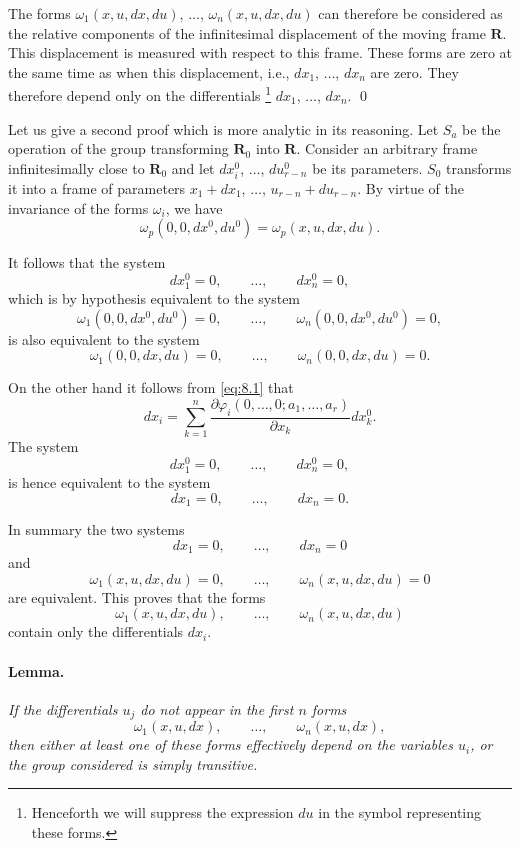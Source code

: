 \documentclass[leqno,11pt]{book}
\makeatletter
\numberwithin{equation}{chapter}
\newcommand{\pd}{\partial}
\theoremstyle{shape1}
\theoremstyle{shapesmall}
\let\old@phi\phi
\let\old@varphi\varphi
\let\phi\old@varphi
\let\varphi\old@phi
\newcommand{\somespace}{\vspace{9pt}}
\makeatother
\begin{document}
The forms $\omega_{1}(x,u,dx,du)$, $\dots$, $\omega_{n}(x,u,dx,du)$ can therefore be considered as the relative components of the infinitesimal displacement of the moving frame $\mathbf{R}$. This displacement is measured with respect to this frame. These forms are zero at the same time as when this displacement, i.e., $dx_{1}$, $\dots$, $dx_{n}$ are zero.  They therefore depend only on the differentials \footnote{Henceforth we will suppress the expression $du$ in the symbol representing these forms.} $dx_{1}$, $\dots$, $dx_{n}$. \qed

\somespace

Let us give a second proof which is more analytic in its reasoning. Let $S_{a}$ be the operation of the group transforming $\mathbf{R}_{0}$ into $\mathbf{R}$. Consider an arbitrary frame infinitesimally close to $\mathbf{R}_{0}$ and let $dx_{i}^{0}$, $\dots$, $du^{0}_{r-n}$ be its parameters. $S_{0}$ transforms it into a frame of parameters $x_{1}+dx_{1}$, $\dots$, $u_{r-n}+du_{r-n}$. By virtue of the invariance of the forms $\omega_{i}$, we have
\[
\omega_{p}(0,0,dx^{0},du^{0})=\omega_{p}(x,u,dx,du).
\]

It follows that the system
\[
dx^{0}_{1}=0,\qquad\dots,\qquad dx_{n}^{0}=0,
\]
which is by hypothesis equivalent to the system
\[
\omega_{1}(0,0,dx^{0},du^{0})=0,\qquad\dots,\qquad \omega_{n}(0,0,dx^{0},du^{0})=0,
\]
is also equivalent to the system
\[
\omega_{1}(0,0,dx,du)=0,\qquad\dots,\qquad \omega_{n}(0,0,dx,du)=0.
\]

On the other hand it follows from \eqref{eq:8.1} that
\[
dx_{i}=\sum_{k=1}^{n}\frac{\pd \phi_{i}(0,\dots,0;a_{1},\dots,a_{r})}{\pd x_{k}}dx_{k}^{0}.
\]
The system
\[
dx^{0}_{1}=0,\qquad\dots,\qquad dx_{n}^{0}=0,
\]
is hence equivalent to the system
\[
dx_{1}=0,\qquad\dots,\qquad dx_{n}=0.
\]

In summary the two systems
\[
dx_{1}=0,\qquad\dots,\qquad dx_{n}=0
\]
and
\[
\omega_{1}(x,u,dx,du)=0,\qquad\dots,\qquad \omega_{n}(x,u,dx,du)=0
\]
are equivalent. This proves that the forms
\[
\omega_{1}(x,u,dx,du),\qquad\dots,\qquad \omega_{n}(x,u,dx,du)
\]
contain only the differentials $dx_{i}$.


\paragraph{Lemma.}
\label{sec:110}
\emph{If the differentials $u_{j}$ do not appear in the first $n$ forms}
\[
\omega_{1}(x,u,dx),\qquad\dots,\qquad \omega_{n}(x,u,dx),
\]
\emph{then either at least one of these forms effectively depend on the variables $u_{i}$, or the group considered is simply transitive.}
\end{document}
